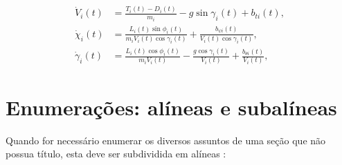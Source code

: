 \begin{equation}\label{eq:point-mass-velocity}
\begin{split}
\dot{V}_i(t) &{}= \frac{T_i(t) - D_i(t)}{m_i} - g \sin \gamma_i(t) + b_{ti}(t), \\
\dot{\chi}_i(t) &{}= \frac{L_i(t) \sin \phi_i(t)}{m_i V_i(t) \cos \gamma_i(t)} + \frac{b_{\psi i}(t)}{V_i(t)\cos \gamma_i(t)},\\
\dot{\gamma}_i(t) &{}= \frac{L_i(t) \cos \phi_i(t)}{m_i V_i(t)} - \frac{g \cos \gamma_i(t)}{V_i(t)} + \frac{b_{\theta i}(t)}{V_i(t)},
\end{split}
\end{equation}

\section{Enumerações: alíneas e subalíneas}

Quando for necessário enumerar os diversos assuntos de uma seção que não possua título, esta deve ser
subdividida em alíneas \cite[seção 4.2]{NBR6024:2012}:


